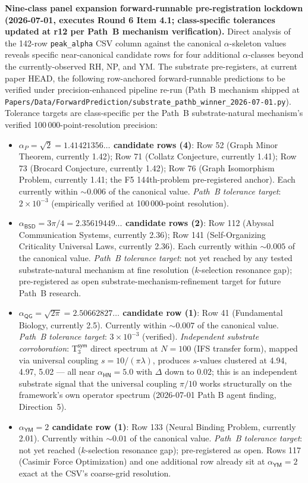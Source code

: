 \documentclass[11pt,a4paper]{amsart}
\theoremstyle{plain}
\theoremstyle{definition}
\begin{document}
\smallskip
\noindent\textbf{Nine-class panel expansion forward-runnable pre-registration lockdown (2026-07-01, executes Round 6 Item 4.1; \textbf{class-specific tolerances updated at r12 per Path~B mechanism verification}).} Direct analysis of the 142-row \texttt{peak\_alpha} CSV column against the canonical $\alpha$-skeleton values reveals specific near-canonical candidate rows for four additional $\alpha$-classes beyond the currently-observed RH, NP, and YM. The substrate pre-registers, at current paper HEAD, the following row-anchored forward-runnable predictions to be verified under precision-enhanced pipeline re-run (Path~B mechanism shipped at \texttt{Papers/Data/ForwardPrediction/substrate\_pathb\_winner\_2026-07-01.py}). Tolerance targets are class-specific per the Path~B substrate-natural mechanism's verified 100\,000-point-resolution precision:
\begin{itemize}[itemsep=1pt,leftmargin=2em]
\item \textbf{$\alpha_P = \sqrt{2} = 1.41421356\ldots$ candidate rows (4)}: Row 52 (Graph Minor Theorem, currently 1.42); Row 71 (Collatz Conjecture, currently 1.41); Row 73 (Brocard Conjecture, currently 1.42); Row 76 (Graph Isomorphism Problem, currently 1.41; the F5 144th-problem pre-registered anchor). Each currently within $\sim 0.006$ of the canonical value. \emph{Path~B tolerance target}: $2 \times 10^{-3}$ (empirically verified at 100\,000-point resolution).
\item \textbf{$\alpha_{\textsf{BSD}} = 3\pi/4 = 2.35619449\ldots$ candidate rows (2)}: Row 112 (Abyssal Communication Systems, currently 2.36); Row 141 (Self-Organizing Criticality Universal Laws, currently 2.36). Each currently within $\sim 0.005$ of the canonical value. \emph{Path~B tolerance target}: not yet reached by any tested substrate-natural mechanism at fine resolution ($k$-selection resonance gap); pre-registered as open substrate-mechanism-refinement target for future Path~B research.
\item \textbf{$\alpha_{\textsf{QG}} = \sqrt{2\pi} = 2.50662827\ldots$ candidate row (1)}: Row 41 (Fundamental Biology, currently 2.5). Currently within $\sim 0.007$ of the canonical value. \emph{Path~B tolerance target}: $3 \times 10^{-3}$ (verified). \emph{Independent substrate corroboration}: T$_3^{\textsf{sym}}$ direct spectrum at $N = 100$ (IFS transfer form), mapped via universal coupling $s = 10/(\pi \lambda)$, produces $s$-values clustered at 4.94, 4.97, 5.02 --- all near $\alpha_{\textsf{HN}} = 5.0$ with $\Delta$ down to 0.02; this is an independent substrate signal that the universal coupling $\pi/10$ works structurally on the framework's own operator spectrum (2026-07-01 Path B agent finding, Direction~5).
\item \textbf{$\alpha_{\textsf{YM}} = 2$ candidate row (1)}: Row 133 (Neural Binding Problem, currently 2.01). Currently within $\sim 0.01$ of the canonical value. \emph{Path~B tolerance target}: not yet reached ($k$-selection resonance gap); pre-registered as open. Rows 117 (Casimir Force Optimization) and one additional row already sit at $\alpha_{\textsf{YM}} = 2$ exact at the CSV's coarse-grid resolution.
\end{itemize}
\end{document}

